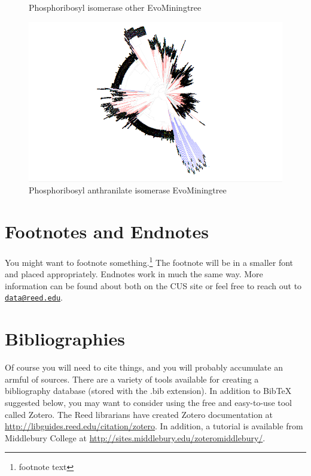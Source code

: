 \documentclass[12pt,twoside]{reedthesis}
\begin{document}
\begin{figure}[h!tbp]
  \caption[Phosphoribosyl isomerase other EvoMiningtree]{\normalsize{Phosphoribosyl isomerase other EvoMiningtree}}
  \label{fig:Phosphoribosyl_isomerase_other_evo_tree}
  \end{figure}\begin{figure}[h!tbp]
  \centering
  \includegraphics[angle = 180,scale = 0.25]{chapter3/tree65.png}
  \caption[Phosphoribosyl anthranilate isomerase EvoMiningtree]{\normalsize{Phosphoribosyl anthranilate isomerase EvoMiningtree}}
  \label{fig:Phosphoribosylanthranilate_isomerase_evo_tree}
  \end{figure}
  
  \clearpage 
  
  \section{Footnotes and Endnotes}\label{footnotes-and-endnotes}
  
  You might want to footnote something.\footnote{footnote text} The
  footnote will be in a smaller font and placed appropriately. Endnotes
  work in much the same way. More information can be found about both on
  the CUS site or feel free to reach out to
  \href{mailto:data@reed.edu}{\nolinkurl{data@reed.edu}}.
  
  \section{Bibliographies}\label{bibliographies}
  
  Of course you will need to cite things, and you will probably accumulate
  an armful of sources. There are a variety of tools available for
  creating a bibliography database (stored with the .bib extension). In
  addition to BibTeX suggested below, you may want to consider using the
  free and easy-to-use tool called Zotero. The Reed librarians have
  created Zotero documentation at
  \url{http://libguides.reed.edu/citation/zotero}. In addition, a tutorial
  is available from Middlebury College at
  \url{http://sites.middlebury.edu/zoteromiddlebury/}.
  
\end{document}
